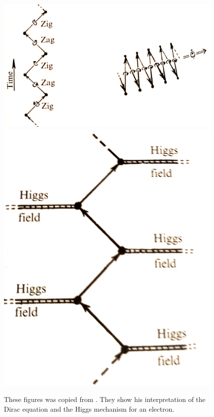 \documentclass[12pt,a4paper]{article}
\begin{document}
\begin{figure}[h]
\centering
\includegraphics[scale=0.23]{zig_zag.png}
\hspace{0.5 in}
\includegraphics[scale=0.16]{zig_zag_higgs.png}
\caption{These figures was copied from \cite{penrose}.  They show his interpretation of the Dirac equation and the Higgs mechanism for an electron.}
\label{zigzag}
\end{figure}
\end{document}
